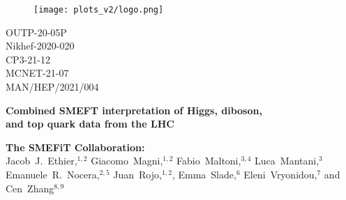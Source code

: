 \documentclass[11pt,a4paper]{article}
\def\[{\left[}
\let\originalleft\left
\renewcommand{\left}{\mathopen{}\mathclose\bgroup\originalleft}
\numberwithin{equation}{section}
\numberwithin{figure}{section}
\numberwithin{table}{section}
\begin{document}
\begin{titlepage}
\thispagestyle{empty}
\noindent
\begin{flushleft}
\begin{figure}[h]
  \texttt{[image: plots\_v2/logo.png]}
\end{figure}
\end{flushleft}
\vspace{-3cm}
\begin{flushright}
OUTP-20-05P \\
Nikhef-2020-020 \\
 CP3-21-12 \\
 MCNET-21-07\\
 MAN/HEP/2021/004
\end{flushright}
\vspace{0.7cm}
\begin{center}
  {\LARGE \bf\boldmath Combined SMEFT interpretation of Higgs, diboson,  \\[0.3cm]
  and top quark data from the LHC   }\vspace{1.4cm}

  {\bf  The SMEFiT Collaboration:} \\[0.1cm]
  
  Jacob~J.~Ethier,$^{1,2}$
  Giacomo~Magni,$^{1,2}$
Fabio~Maltoni,$^{3,4}$
Luca~Mantani,$^{3}$\\[0.1cm]
Emanuele~R.~Nocera,$^{2,5}$
Juan~Rojo,$^{1,2}$,
Emma~Slade,$^6$ Eleni~Vryonidou,$^7$ and
Cen~Zhang$^{8,9}$


\end{center}
\end{titlepage}
\end{document}
